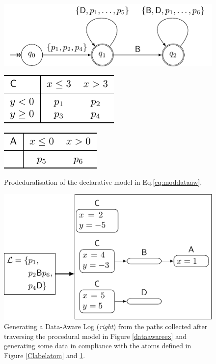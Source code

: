 \documentclass[sigconf]{acmart}
\begin{document}
\begin{figure}[!b]
\centering
\begin{minipage}{\linewidth}
\centering
\includegraphics[scale=.7]{fig/dataaware}
\label{dataawareex}
\end{minipage}

\begin{minipage}{.45\linewidth}\centering
\includegraphics[scale=.8]{fig/tab1b}
\label{Clabelatom}
\end{minipage}\quad \begin{minipage}{.45\linewidth}
\centering
\includegraphics[scale=.8]{fig/tab1c}
\quad\\ \medskip\medskip
{}\label{Alabelatom}
\end{minipage}
\caption{Prodeduralisation of the declarative model in Eq.\ref{eq:moddataaw}.}
\end{figure}
\begin{figure}[!t]
\centering
\includegraphics[scale=.7]{fig/loggenerator}
\caption{Generating a Data-Aware Log (\textit{right}) from the paths collected after traversing the procedural model in Figure \ref{dataawareex} and generating some data in compliance with the atoms defined in Figure \ref{Clabelatom} and \ref{Alabelatom}.}\label{loggenex}
\end{figure}
\end{document}
